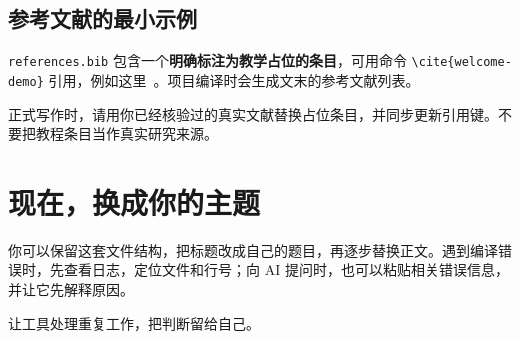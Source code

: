 \subsection{参考文献的最小示例}
\texttt{references.bib} 包含一个\textbf{明确标注为教学占位的条目}，可用命令 \verb|\cite{welcome-demo}| 引用，例如这里~\cite{welcome-demo}。项目编译时会生成文末的参考文献列表。

正式写作时，请用你已经核验过的真实文献替换占位条目，并同步更新引用键。不要把教程条目当作真实研究来源。

\section{现在，换成你的主题}
你可以保留这套文件结构，把标题改成自己的题目，再逐步替换正文。遇到编译错误时，先查看日志，定位文件和行号；向 AI 提问时，也可以粘贴相关错误信息，并让它先解释原因。

\begin{center}
\color{ScribeBlue}\large 让工具处理重复工作，把判断留给自己。
\end{center}

